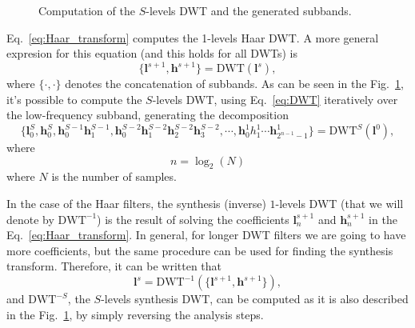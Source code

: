 \begin{figure}
  \centering
  \caption{Computation of the $S$-levels DWT and the generated
    subbands.}
  \label{fig:DWT}
\end{figure}

Eq.~\ref{eq:Haar_transform} computes the 1-levels Haar DWT. A more
general expresion for this equation (and this holds for all DWTs) is
\begin{equation}
  \{{\mathbf l}^{s+1}, {\mathbf h}^{s+1}\} = \text{DWT}({\mathbf l}^s),
  \label{eq:DWT}
\end{equation}
where $\{\cdot,\cdot\}$ denotes the concatenation of subbands. As can
be seen in the Fig.~\ref{fig:DWT}, it's possible to compute the
$S$-levels DWT, using Eq.~\ref{eq:DWT} iteratively over the
low-frequency subband, generating the decomposition
\begin{equation}
  \{{\mathbf l}^S_0, {\mathbf h}^S_0, {\mathbf h}^{S-1}_0 {\mathbf
    h}^{S-1}_1, {\mathbf h}^{S-2}_0 {\mathbf h}^{S-2}_1 {\mathbf
    h}^{S-2}_2 {\mathbf h}^{S-2}_3, \cdots, {\mathbf h}^1_0 h^1_1
  \cdots {\mathbf h}^1_{2^{n-1}-1}\}=\text{DWT}^S({\mathbf l}^0),
  \label{eq:S_levels_DWT}
\end{equation}
where
\begin{equation}
  n = \log_2(N)
\end{equation}
where $N$ is the number of samples.

In the case of the Haar filters, the synthesis (inverse) $1$-levels
DWT (that we will denote by $\text{DWT}^{-1}$) is the result of
solving the coefficients ${\mathbf l}^{s+1}_n$ and ${\mathbf h}^{s+1}_n$ in the
Eq.~\ref{eq:Haar_transform}. In general, for longer DWT filters we are
going to have more coefficients, but the same procedure can be used
for finding the synthesis transform. Therefore, it can be written that
\begin{equation}
  {\mathbf l}^s = \text{DWT}^{-1}(\{{\mathbf l}^{s+1}, {\mathbf h}^{s+1}\}),
\end{equation}
and $\text{DWT}^{-S}$, the $S$-levels synthesis DWT, can be computed
as it is also described in the Fig.~\ref{fig:DWT}, by simply reversing
the analysis steps.

